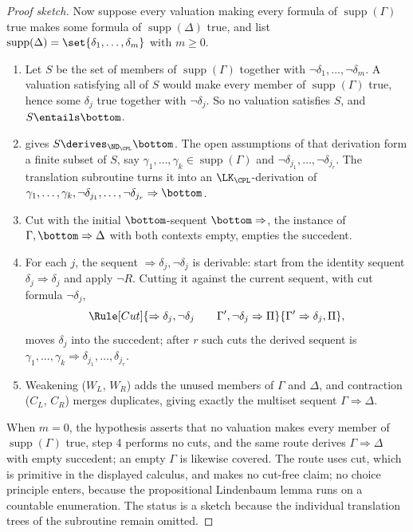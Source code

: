\begin{proof}[Proof sketch]
Now suppose every valuation making every formula of
\(\operatorname{supp}(\Gamma)\) true makes some formula of
\(\operatorname{supp}(\Delta)\) true, and list
\(\operatorname{supp}(\Delta)=\set{\delta_1,\ldots,\delta_m}\) with
\(m\geq0\).
\begin{enumerate}
  \item Let \(S\) be the set of members of
        \(\operatorname{supp}(\Gamma)\) together with
        \(\neg\delta_1,\ldots,\neg\delta_m\).  A valuation satisfying
        all of \(S\) would make every member of
        \(\operatorname{supp}(\Gamma)\) true, hence some
        \(\delta_j\) true together with \(\neg\delta_j\).  So no
        valuation satisfies \(S\), and \(S\entails\bottom\).
  \item {} gives
        \(S\derives_{\ND_{\CPL}}\bottom\).  The open assumptions of
        that derivation form a finite subset of \(S\), say
        \(\gamma_1,\ldots,\gamma_k\in\operatorname{supp}(\Gamma)\) and
        \(\neg\delta_{j_1},\ldots,\neg\delta_{j_r}\).  The translation
        subroutine turns it into an \(\LK_{\CPL}\)-derivation of
        \(\gamma_1,\ldots,\gamma_k,
        \neg\delta_{j_1},\ldots,\neg\delta_{j_r}\Rightarrow\bottom\).
  \item Cut with the initial \(\bottom\)-sequent
        \(\bottom\Rightarrow\), the instance of
        \(\Gamma,\bottom\Rightarrow\Delta\) with both contexts empty,
        empties the succedent.
  \item For each \(j\), the sequent
        \(\Rightarrow\delta_j,\neg\delta_j\) is derivable: start from
        the identity sequent \(\delta_j\Rightarrow\delta_j\) and apply
        \(\neg R\).  Cutting it against the current sequent, with cut
        formula \(\neg\delta_j\),
        \[
         \Rule[Cut]{\Rightarrow\delta_j,\neg\delta_j\qquad
          \Gamma',\neg\delta_j\Rightarrow\Pi}
          {\Gamma'\Rightarrow\delta_j,\Pi},
        \]
        moves \(\delta_j\) into the succedent; after \(r\) such cuts
        the derived sequent is
        \(\gamma_1,\ldots,\gamma_k\Rightarrow
        \delta_{j_1},\ldots,\delta_{j_r}\).
  \item Weakening (\(W_L\), \(W_R\)) adds the unused members of
        \(\Gamma\) and \(\Delta\), and contraction (\(C_L\),
        \(C_R\)) merges duplicates, giving exactly the multiset
        sequent \(\Gamma\Rightarrow\Delta\).
\end{enumerate}
When \(m=0\), the hypothesis asserts that no valuation makes every
member of \(\operatorname{supp}(\Gamma)\) true, step 4 performs no cuts,
and the same route derives \(\Gamma\Rightarrow\Delta\) with empty
succedent; an empty \(\Gamma\) is likewise covered.  The route uses cut,
which is primitive in the displayed calculus, and makes no cut-free
claim; no choice principle enters, because the propositional Lindenbaum
lemma runs on a countable enumeration.  The status is a sketch because
the individual translation trees of the subroutine remain omitted.
\end{proof}

